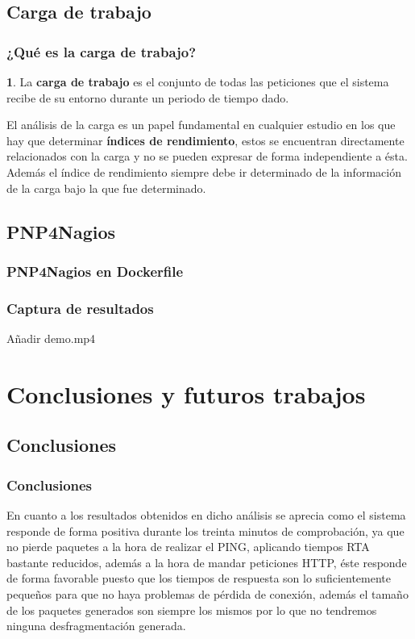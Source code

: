 \documentclass{beamer}
\theoremstyle{plain}
\theoremstyle{definition}
\newtheorem{defn}[thm]{}
\theoremstyle{plain}
\theoremstyle{definition}
\theoremstyle{remark}
\theoremstyle{definition}
\begin{document}
\subsection{Carga de trabajo}
\begin{frame}
	\frametitle{¿Qué es la carga de trabajo?}
	\begin{defn}
		La \textbf{carga de trabajo} es el conjunto de todas las peticiones que el sistema recibe de su entorno
		durante un periodo de tiempo dado.
	\end{defn}
El análisis de la carga es un papel fundamental en cualquier
estudio en los que hay que determinar \textbf{índices de rendimiento}, estos se
encuentran directamente relacionados con la carga y no se pueden expresar
de forma independiente a ésta. Además el índice de rendimiento siempre debe
ir determinado de la información de la carga bajo la que fue determinado.
	
\end{frame}
\subsection{PNP4Nagios}

\begin{frame}
	\frametitle{PNP4Nagios en Dockerfile}
\end{frame}
\begin{frame}
	\frametitle{Captura de resultados}
	Añadir demo.mp4
\end{frame}


\section{Conclusiones y futuros trabajos}
\subsection{Conclusiones}
\begin{frame}
	\frametitle{Conclusiones}
	En cuanto a los resultados obtenidos en dicho análisis se aprecia
	como el sistema responde de forma positiva durante los treinta minutos de
	comprobación, ya que no pierde paquetes a la hora de realizar el PING,
	aplicando tiempos RTA bastante reducidos, además a la hora de mandar
	peticiones HTTP, éste responde de forma favorable puesto que los tiempos
	de respuesta son lo suficientemente pequeños para que no haya problemas
	de pérdida de conexión, además el tamaño de los paquetes generados son
	siempre los mismos por lo que no tendremos ninguna desfragmentación generada.
	
\end{frame}
\end{document}
